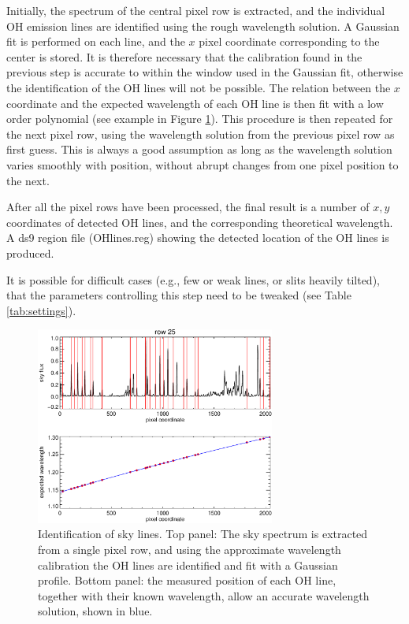 \documentclass[a4paper]{article}
\begin{document}
Initially, the spectrum of the central pixel row is extracted, and the individual OH emission lines are identified using the rough wavelength solution. A Gaussian fit is performed on each line, and the $x$ pixel coordinate corresponding to the center is stored. It is therefore necessary that the calibration found in the previous step is accurate to within the window used in the Gaussian fit, otherwise the identification of the OH lines will not be possible. The relation between the $x$ coordinate and the expected wavelength of each OH line is then fit with a low order polynomial (see example in Figure \ref{fig:speclines}). This procedure is then repeated for the next pixel row, using the wavelength solution from the previous pixel row as first guess. This is always a good assumption as long as the wavelength solution varies smoothly with position, without abrupt changes from one pixel position to the next.

After all the pixel rows have been processed, the final result is a number of $x,y$ coordinates of detected OH lines, and the corresponding theoretical wavelength. A ds9 region file (OHlines.reg) showing the detected location of the OH lines is produced.

It is possible for difficult cases (e.g., few or weak lines, or slits heavily tilted), that the parameters controlling this step need to be tweaked (see Table \ref{tab:settings}).


\begin{figure}[tbp]
\centering
\includegraphics[width=0.7\textwidth]{wavecal_accurate}
\caption{Identification of sky lines. Top panel: The sky spectrum is extracted from a single pixel row, and using the approximate wavelength calibration the OH lines are identified and fit with a Gaussian profile. Bottom panel: the measured position of each OH line, together with their known wavelength, allow an accurate wavelength solution, shown in blue.}
\label{fig:speclines}
\end{figure}
\end{document}
